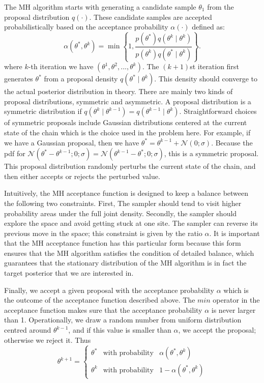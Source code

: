 \documentclass[12pt]{report}
\begin{document}
 The MH algorithm starts with generating a candidate sample $\theta_{1}$ from the proposal distribution $q(·)$. These candidate samples are accepted probabilistically based on the acceptance probability $α(·)$ defined as:
\begin{equation}
\alpha(\theta^*,\theta^k)= \min\left \{ 1, \frac{p(\theta^*)q(\theta^k \mid \theta^k)}{p(\theta^k)q(\theta^* \mid \theta^k)}  \right \}.
\end{equation} 
where $k$-th iteration we have $(\theta^1,\theta^2,...,\theta^k)$. The $(k+1)$st iteration first generates $\theta^*$ from a proposal density $q(\theta^* \mid \theta^k)$. This density should converge to the actual posterior distribution in theory. There are mainly two kinds of proposal distributions, symmetric and asymmetric. A proposal distribution is a symmetric distribution if $q(\theta^k\mid \theta^{k−1})= q(\theta^{k−1}\mid \theta^k)$. Straightforward choices of symmetric proposals include Gaussian distributions centered at the current state of the chain which is the choice used in the problem here. For example, if we have a Gaussian proposal, then we have $\theta^* = \theta^{k-1}+\mathcal{N}(0; \sigma)$. Because the pdf for $\mathcal{N}(\theta^*-\theta^{k-1}; 0; \sigma) = \mathcal{N}(\theta^{k-1}-\theta^*; 0; \sigma)$, this is a symmetric proposal. This proposal distribution randomly perturbs the current state of the chain, and then either accepts or rejects the perturbed value. 
 
Intuitively, the MH acceptance function is designed to keep a balance between the following two constraints. First, The sampler should tend to visit higher probability areas under the full joint density. Secondly, the sampler should explore the space and avoid getting stuck at one site. The sampler can reverse its previous move in the space; this constraint is given by the ratio $\alpha$. It is important that the MH acceptance function has this particular form because this form
ensures that the MH algorithm satisfies the condition of detailed balance, which guarantees
that the stationary distribution of the MH algorithm is in fact the target posterior that we
are interested in.

Finally, we accept a given proposal with the acceptance probability $\alpha$ which is the outcome of the acceptance function described above. The $min$ operator in the acceptance function makes sure that the acceptance probability $\alpha$ is never larger than 1. Operationally, we draw a random number from uniform distribution centred around $\theta^{k-1}$, and if this value is smaller than $\alpha$, we accept the proposal; otherwise we reject it. Thus
\begin{equation}
\theta^{k+1}= 
\left\{\begin{matrix}
\theta^* & \text{with probability} & \alpha(\theta^*,\theta^k)\\ 
\theta^{k} & \text{with probability} & 1- \alpha(\theta^*,\theta^k) 
\end{matrix}\right.
\end{equation}
\end{document}
